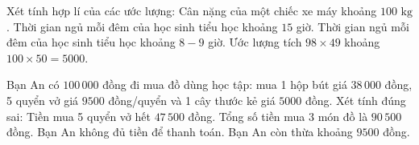 \begin{ex} %
Xét tính hợp lí của các ước lượng:
\choiceTF
{\True Cân nặng của một chiếc xe máy khoảng $100\text{ kg}$.}
{Thời gian ngủ mỗi đêm của học sinh tiểu học khoảng $15$ giờ.}
{\True Thời gian ngủ mỗi đêm của học sinh tiểu học khoảng $8 - 9$ giờ.}
{\True Ước lượng tích $98 \times 49$ khoảng $100 \times 50 = 5000$.}
\end{ex}

\begin{ex} %
Bạn An có $100\,000$ đồng đi mua đồ dùng học tập: mua 1 hộp bút giá $38\,000$ đồng, 5 quyển vở giá $9500$ đồng/quyển và 1 cây thước kẻ giá $5000$ đồng. Xét tính đúng sai:
\choiceTF
{\True Tiền mua 5 quyển vở hết $47\,500$ đồng.}
{\True Tổng số tiền mua 3 món đồ là $90\,500$ đồng.}
{Bạn An không đủ tiền để thanh toán.}
{\True Bạn An còn thừa khoảng $9500$ đồng.}
\end{ex}

